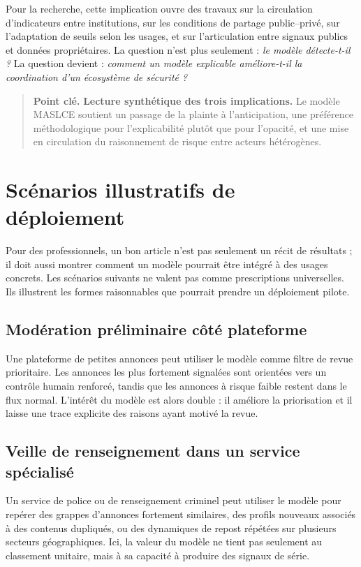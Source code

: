 \documentclass[10pt,a4paper]{article}
\newcommand{\callout}[1]{%
  \begin{quote}\small\textbf{Point clé.} #1\end{quote}}
\begin{document}
Pour la recherche, cette implication ouvre des travaux sur la circulation d'indicateurs entre institutions, sur les conditions de partage public--privé, sur l'adaptation de seuils selon les usages, et sur l'articulation entre signaux publics et données propriétaires. La question n'est plus seulement : \emph{le modèle détecte-t-il ?} La question devient : \emph{comment un modèle explicable améliore-t-il la coordination d'un écosystème de sécurité ?}

\callout{\textbf{Lecture synthétique des trois implications.} Le modèle MASLCE soutient un passage de la plainte à l'anticipation, une préférence méthodologique pour l'explicabilité plutôt que pour l'opacité, et une mise en circulation du raisonnement de risque entre acteurs hétérogènes.}

\section{Scénarios illustratifs de déploiement}
Pour des professionnels, un bon article n'est pas seulement un récit de résultats ; il doit aussi montrer comment un modèle pourrait être intégré à des usages concrets. Les scénarios suivants ne valent pas comme prescriptions universelles. Ils illustrent les formes raisonnables que pourrait prendre un déploiement pilote.

\subsection{Modération préliminaire côté plateforme}
Une plateforme de petites annonces peut utiliser le modèle comme filtre de revue prioritaire. Les annonces les plus fortement signalées sont orientées vers un contrôle humain renforcé, tandis que les annonces à risque faible restent dans le flux normal. L'intérêt du modèle est alors double : il améliore la priorisation et il laisse une trace explicite des raisons ayant motivé la revue.

\subsection{Veille de renseignement dans un service spécialisé}
Un service de police ou de renseignement criminel peut utiliser le modèle pour repérer des grappes d'annonces fortement similaires, des profils nouveaux associés à des contenus dupliqués, ou des dynamiques de repost répétées sur plusieurs secteurs géographiques. Ici, la valeur du modèle ne tient pas seulement au classement unitaire, mais à sa capacité à produire des signaux de série.
\end{document}
